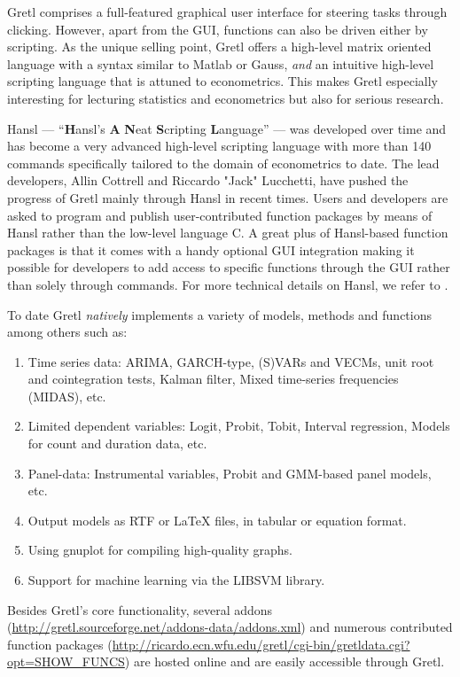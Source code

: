 \documentclass[11pt]{article}
\begin{document}
Gretl comprises a full-featured graphical user interface for steering tasks through clicking. However, apart from the GUI, functions can also be driven either by scripting. As the unique selling point, Gretl offers a high-level matrix oriented language with a syntax similar to Matlab or Gauss, \textit{and} an intuitive high-level scripting language that is attuned to econometrics. This makes Gretl especially interesting for lecturing statistics and econometrics but also for serious research.

Hansl --- “\textbf{H}ansl’s \textbf{A} \textbf{N}eat \textbf{S}cripting \textbf{L}anguage” --- was developed over time and has become a very advanced high-level scripting language with more than 140 commands specifically tailored to the domain of econometrics to date. 
The lead developers, Allin Cottrell and Riccardo "Jack" Lucchetti, have pushed the progress of Gretl mainly through Hansl in recent times. Users and developers are asked to program and publish user-contributed function packages by means of Hansl rather than the low-level language C. A great plus of Hansl-based function packages is that it comes with a handy optional GUI integration making it possible for developers to add access to specific functions through the GUI rather than solely through commands. %
For more technical details on Hansl, we refer to \citet{Cottrell2017}.


To date Gretl \textit{natively} implements a variety of models, methods and functions among others such as: 
\begin{enumerate}
	\item Time series data: ARIMA, GARCH-type, (S)VARs and VECMs, unit root and cointegration tests, Kalman filter, Mixed time-series frequencies (MIDAS), etc.
	\item Limited dependent variables: Logit, Probit, Tobit, Interval regression, Models for count and duration data, etc.
	\item Panel-data: Instrumental variables, Probit and
	GMM-based panel models, etc.
	\item Output models as RTF or LaTeX files, in tabular or equation format.
	\item Using gnuplot for compiling high-quality graphs.
	\item Support for machine learning via the LIBSVM library.
\end{enumerate}
Besides Gretl's core functionality, several addons (\url{http://gretl.sourceforge.net/addons-data/addons.xml}) and numerous contributed function packages (\url{http://ricardo.ecn.wfu.edu/gretl/cgi-bin/gretldata.cgi?opt=SHOW_FUNCS}) are hosted online and are easily accessible through Gretl.
\end{document}
